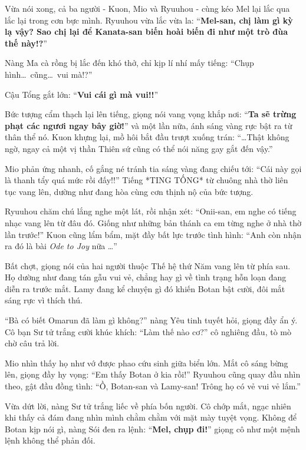 \documentclass[../main.tex]{subfiles}
\begin{document}
Vừa nói xong, cả ba người - Kuon, Mio và Ryuuhou - cùng kéo Mel lại lắc qua lắc lại trong cơn bực mình. Ryuuhou vừa lắc vừa la: ``\textbf{Mel-san, chị làm gì kỳ lạ vậy? Sao chị lại để Kanata-san biến hoài biến đi như một trò đùa thế này!?}''

Nàng Ma cà rồng bị lắc đến khó thở, chỉ kịp lí nhí mấy tiếng: ``Chụp hình\dots\ cũng\dots\ vui mà!?''

Cậu Tổng gắt lớn: ``\textbf{Vui cái gì mà vui!!}''


Bức tượng cẩm thạch lại lên tiếng, giọng nói vang vọng khắp nơi: ``\textbf{Ta sẽ trừng phạt các ngươi ngay bây giờ!}'' và một lần nữa, ánh sáng vàng rực bật ra từ thân thể nó. Kuon khựng lại, mồ hôi bắt đầu trượt xuống trán: ``\dots Thật không ngờ, ngay cả một vị thần Thiên sứ cũng có thể nói năng gay gắt đến vậy.''

Mio phản ứng nhanh, cố gắng né tránh tia sáng vàng đang chiếu tới: ``Cái này gọi là thanh tẩy quá mức rồi đấy!!'' Tiếng *TING TỐNG* từ chuông nhà thờ liên tục vang lên, dường như đang hòa cùng cơn thịnh nộ của bức tượng.

Ryuuhou chăm chú lắng nghe một lát, rồi nhận xét: ``Onii-san, em nghe có tiếng nhạc vang lên từ đâu đó. Giống như những bản thánh ca em từng nghe ở nhà thờ lần trước!'' Kuon cũng lẩm bẩm, mặt đầy bất lực trước tình hình: ``Anh còn nhận ra đó là bài \textit{Ode to Joy} nữa \dots''

Bất chợt, giọng nói của hai người thuộc Thế hệ thứ Năm vang lên từ phía sau. Họ dường như đang tán gẫu vui vẻ, chẳng hay gì về tình trạng hỗn loạn đang diễn ra trước mắt. Lamy đang kể chuyện gì đó khiến Botan bật cười, đôi mắt sáng rực vì thích thú.

``Bà có biết Omarun đã làm gì không?'' nàng Yêu tinh tuyết hỏi, giọng đầy ẩn ý. Cô bạn Sư tử trắng cười khúc khích: ``Làm thế nào cơ?'' cô nghiêng đầu, tò mò chờ câu trả lời.

Mio nhìn thấy họ như vớ được phao cứu sinh giữa biển lớn. Mắt cô sáng bừng lên, giọng đầy hy vọng: ``Em thấy Botan ở kia rồi!'' Ryuuhou cũng quay đầu nhìn theo, gật đầu đồng tình: ``Ồ, Botan-san và Lamy-san! Trông họ có vẻ vui vẻ lắm.''

Vừa dứt lời, nàng Sư tử trắng liếc về phía bốn người. Cô chớp mắt, ngạc nhiên khi thấy cả đám đang nhìn mình chằm chằm với mặt mày tuyệt vọng. Không để Botan kịp nói gì, nàng Sói đen ra lệnh: ``\textbf{Mel, chụp đi!}'' giọng cô như một mệnh lệnh không thể phản đối.
\end{document}
